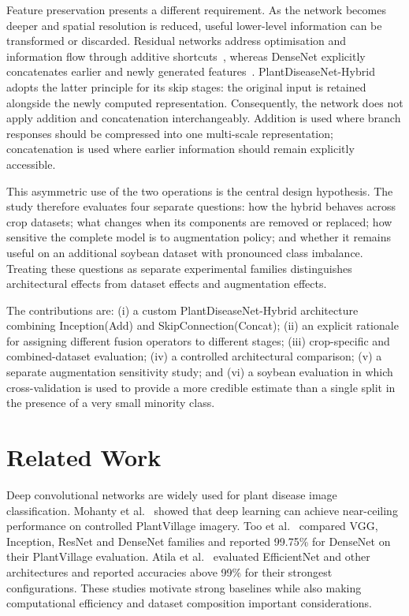 \documentclass[a4paper,fleqn]{cas-dc}
\begin{document}
Feature preservation presents a different requirement. As the network becomes deeper and spatial resolution is reduced, useful lower-level information can be transformed or discarded. Residual networks address optimisation and information flow through additive shortcuts~\citep{he2016}, whereas DenseNet explicitly concatenates earlier and newly generated features~\citep{huang2017}. PlantDiseaseNet-Hybrid adopts the latter principle for its skip stages: the original input is retained alongside the newly computed representation. Consequently, the network does not apply addition and concatenation interchangeably. Addition is used where branch responses should be compressed into one multi-scale representation; concatenation is used where earlier information should remain explicitly accessible.

This asymmetric use of the two operations is the central design hypothesis. The study therefore evaluates four separate questions: how the hybrid behaves across crop datasets; what changes when its components are removed or replaced; how sensitive the complete model is to augmentation policy; and whether it remains useful on an additional soybean dataset with pronounced class imbalance. Treating these questions as separate experimental families distinguishes architectural effects from dataset effects and augmentation effects.

The contributions are: (i) a custom PlantDiseaseNet-Hybrid architecture combining Inception(Add) and SkipConnection(Concat); (ii) an explicit rationale for assigning different fusion operators to different stages; (iii) crop-specific and combined-dataset evaluation; (iv) a controlled architectural comparison; (v) a separate augmentation sensitivity study; and (vi) a soybean evaluation in which cross-validation is used to provide a more credible estimate than a single split in the presence of a very small minority class.

\section{Related Work}
Deep convolutional networks are widely used for plant disease image classification. Mohanty et al.~\citep{mohanty2016} showed that deep learning can achieve near-ceiling performance on controlled PlantVillage imagery. Too et al.~\citep{too2019} compared VGG, Inception, ResNet and DenseNet families and reported 99.75\% for DenseNet on their PlantVillage evaluation. Atila et al.~\citep{atila2021} evaluated EfficientNet and other architectures and reported accuracies above 99\% for their strongest configurations. These studies motivate strong baselines while also making computational efficiency and dataset composition important considerations.
\end{document}
